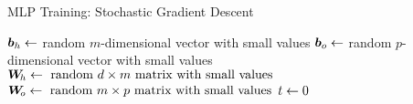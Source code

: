 \begin{frame}{MLP Training: Stochastic Gradient Descent}
\begin{tightalgo}[H]{\textwidth-18pt}
\Algorithm{}
${\boldsymbol b}_{h} \leftarrow$ random $m$-dimensional vector with small
values\; 
${\boldsymbol b}_{o} \leftarrow$ random $p$-dimensional vector with small
values\;
${\boldsymbol W}_{\!h} \leftarrow \text{ random } d \times m \text{ matrix with small
values}$\;
${\boldsymbol W}_{\!o} \leftarrow  \text{ random } m \times p \text{ matrix with small
values}$\;
$t \leftarrow 0$ \;
\end{tightalgo}
\end{frame}


